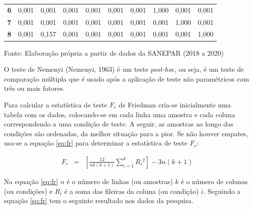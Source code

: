 \begin{table}[H]
\begin{tabular}{@{}clllllllll@{}}
		\textbf{6}                           & 0,001                          & 0,001                          & 0,001                          & 0,001                          & 0,001                          & 0,001                          & 1,000                          & 0,001                          & 0,001                          \\
		\textbf{7}                           & 0,001                          & 0,001                          & 0,001                          & 0,001                          & 0,001                          & 0,001                          & 0,001                          & 1,000                          & 0,001                          \\
		\textbf{8}                           & 0,001                          & 0,157                          & 0,001                          & 0,001                          & 0,001                          & 0,001                          & 0,001                          & 0,001                          & 1,000                          \\ \bottomrule
	\end{tabular}

Fonte: Elaboração própria a partir de dados da SANEPAR (2018 a 2020)
\end{table}

O teste de Nemenyi (Nemenyi, 1963) é um teste \textit{post-hoc}, ou seja, é um teste de comparação múltipla que é usado após a aplicação de teste não paramétricos com três ou mais fatores.
    
Para calcular a estatística de teste $F_r$ de Friedman cria-se inicialmente uma tabela com os dados, colocando-se em cada linha uma amostra e cada coluna correspondendo a uma condição de teste. A seguir, as amostras ao longo das condições são ordenadas, da melhor situação para a pior. Se não houver empates, usa-se a equação \eqref{eq:fr} para determinar a estatística de teste $F_r$:

\begin{eqnarray}
	F_r&=&\left[\frac{12}{n k(k+1)} \sum_{i=1}^k R_i{ }^2\right]-3 n(k+1)\label{eq:fr}
\end{eqnarray}
  
  Na equação \eqref{eq:fr} $n$ é o número de linhas (ou amostras) $k$ é o número de colunas (ou condições) e $R_i$ é a soma das fileiras da coluna (ou condição) $i$.   
Seguindo a equação \eqref{eq:fr} tem o seguinte resultado nos dados da pesquisa.
  

